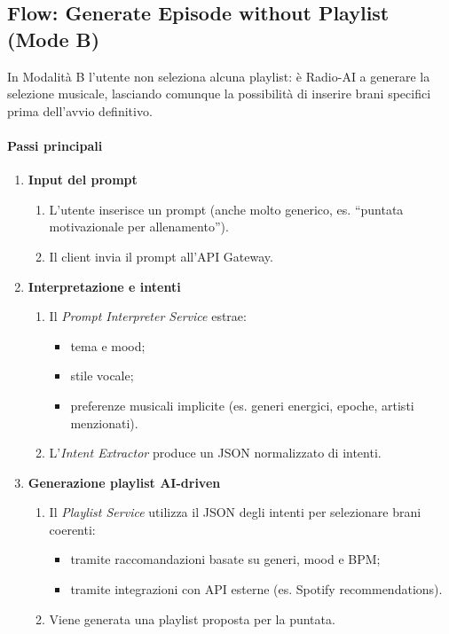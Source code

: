 \documentclass[11pt,a4paper]{article}
\begin{document}

\subsection{Flow: Generate Episode without Playlist (Mode B)}

In Modalità B l'utente non seleziona alcuna playlist: è Radio-AI a generare la selezione musicale, lasciando comunque la possibilità di inserire brani specifici prima dell'avvio definitivo.

\paragraph{Passi principali}

\begin{enumerate}
    \item \textbf{Input del prompt}
    \begin{enumerate}
        \item L'utente inserisce un prompt (anche molto generico, es. ``puntata motivazionale per allenamento'').
        \item Il client invia il prompt all'API Gateway.
    \end{enumerate}

    \item \textbf{Interpretazione e intenti}
    \begin{enumerate}
        \item Il \textit{Prompt Interpreter Service} estrae:
        \begin{itemize}
            \item tema e mood;
            \item stile vocale;
            \item preferenze musicali implicite (es. generi energici, epoche, artisti menzionati).
        \end{itemize}
        \item L'\textit{Intent Extractor} produce un JSON normalizzato di intenti.
    \end{enumerate}

    \item \textbf{Generazione playlist AI-driven}
    \begin{enumerate}
        \item Il \textit{Playlist Service} utilizza il JSON degli intenti per selezionare brani coerenti:
        \begin{itemize}
            \item tramite raccomandazioni basate su generi, mood e BPM;
            \item tramite integrazioni con API esterne (es. Spotify recommendations).
        \end{itemize}
        \item Viene generata una playlist proposta per la puntata.
    \end{enumerate}


\end{enumerate}
\end{document}
